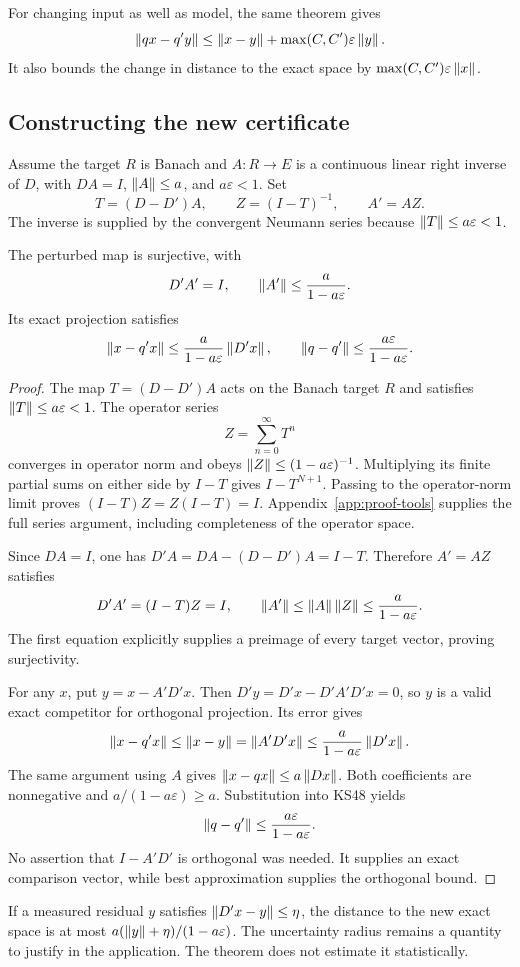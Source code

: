 For changing input as well as model, the same theorem gives
\[
 \left\lVert qx-q'y\right\rVert\le\left\lVert x-y\right\rVert+\max(C,C')\varepsilon\left\lVert y\right\rVert.
\]
It also bounds the change in distance to the exact space by \(\max(C,C')\varepsilon\left\lVert x\right\rVert\).

\subsection{Constructing the new certificate}
Assume the target \(R\) is Banach and \(A:R\to E\) is a continuous linear right inverse of \(D\), with \(DA=I\), \(\left\lVert A\right\rVert\le a\), and \(a\varepsilon<1\). Set
\[
 T=(D-D')A,\qquad Z=(I-T)^{-1},\qquad A'=AZ.
\]
The inverse is supplied by the convergent Neumann series because \(\left\lVert T\right\rVert\le a\varepsilon<1\).

\begin{theorem}\label{KS49}
The perturbed map is surjective, with
\[
 D'A'=I,\qquad \left\lVert A'\right\rVert\le\frac{a}{1-a\varepsilon}.
\]
Its exact projection satisfies
\[
 \left\lVert x-q'x\right\rVert\le\frac{a}{1-a\varepsilon}\left\lVert D'x\right\rVert,\qquad
 \left\lVert q-q'\right\rVert\le\frac{a\varepsilon}{1-a\varepsilon}.
\]
\end{theorem}
\begin{proof}
The map $T=(D-D')A$ acts on the Banach target $R$ and satisfies $\left\lVert T\right\rVert\le a\varepsilon<1$. The operator series
\[
 Z=\sum_{n=0}^\infty T^n
\]
converges in operator norm and obeys $\left\lVert Z\right\rVert\le(1-a\varepsilon)^{-1}$. Multiplying its finite partial sums on either side by $I-T$ gives $I-T^{N+1}$. Passing to the operator-norm limit proves $(I-T)Z=Z(I-T)=I$. Appendix~\ref{app:proof-tools} supplies the full series argument, including completeness of the operator space.

Since $DA=I$, one has $D'A=DA-(D-D')A=I-T$. Therefore $A'=AZ$ satisfies
\[
 D'A'=(I-T)Z=I,\qquad
 \left\lVert A'\right\rVert\le\left\lVert A\right\rVert\left\lVert Z\right\rVert\le\frac a{1-a\varepsilon}.
\]
The first equation explicitly supplies a preimage of every target vector, proving surjectivity.

For any $x$, put $y=x-A'D'x$. Then $D'y=D'x-D'A'D'x=0$, so $y$ is a valid exact competitor for orthogonal projection. Its error gives
\[
 \left\lVert x-q'x\right\rVert\le\left\lVert x-y\right\rVert=\left\lVert A'D'x\right\rVert
 \le\frac a{1-a\varepsilon}\left\lVert D'x\right\rVert.
\]
The same argument using $A$ gives $\left\lVert x-qx\right\rVert\le a\left\lVert Dx\right\rVert$. Both coefficients are nonnegative and $a/(1-a\varepsilon)\ge a$. Substitution into KS48 yields
\[
 \left\lVert q-q'\right\rVert\le\frac{a\varepsilon}{1-a\varepsilon}.
\]
No assertion that $I-A'D'$ is orthogonal was needed. It supplies an exact comparison vector, while best approximation supplies the orthogonal bound.
\end{proof}
If a measured residual \(y\) satisfies \(\left\lVert D'x-y\right\rVert\le\eta\), the distance to the new exact space is at most \(a(\left\lVert y\right\rVert+\eta)/(1-a\varepsilon)\). The uncertainty radius remains a quantity to justify in the application. The theorem does not estimate it statistically.

